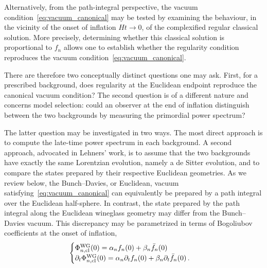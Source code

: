 \documentclass[a4paper,11pt]{article}
\begin{document}
Alternatively, from the path-integral perspective, the vacuum condition~\eqref{eq:vacuum_canonical} may be tested by examining the behaviour, in the vicinity of the onset of inflation $Ht\to 0$, of the complexified regular classical solution. More precisely, determining whether this classical solution is proportional to $f_{n}$ allows one to establish whether the regularity condition reproduces the vacuum condition~\eqref{eq:vacuum_canonical}.

There are therefore two conceptually distinct questions one may ask. First, for a prescribed background, does regularity at the Euclidean endpoint reproduce the canonical vacuum condition? The second question is of a different nature and concerns model selection: could an observer at the end of inflation distinguish between the two backgrounds by measuring the primordial power spectrum?

The latter question may be investigated in two ways. The most direct approach is to compute the late-time power spectrum in each background. A second approach, advocated in Lehners' work, is to assume that the two backgrounds have exactly the same Lorentzian evolution, namely a de Sitter evolution, and to compare the states prepared by their respective Euclidean geometries. As we review below, the Bunch--Davies, or Euclidean, vacuum satisfying~\eqref{eq:vacuum_canonical} can equivalently be prepared by a path integral over the Euclidean half-sphere. In contrast, the state prepared by the path integral along the Euclidean wineglass geometry may differ from the Bunch--Davies vacuum. This discrepancy may be parametrized in terms of Bogoliubov coefficients at the onset of inflation,
\begin{equation}
\begin{cases}
\Phi_{n,\rm cl}^{\rm WG}(0)
=
\alpha_n f_n(0)
+
\beta_n \bar{f}_n(0)\,\\
\partial_t\Phi_{n,\rm cl}^{\rm WG}(0)
=
\alpha_n \partial_t f_n(0)
+
\beta_n \partial_t\bar{f}_n(0)\,.
\end{cases}
\end{equation}
\end{document}
